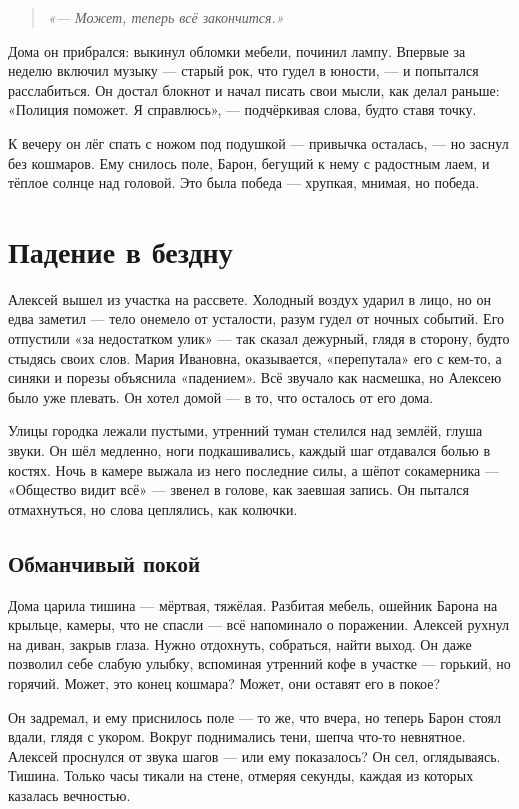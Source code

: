 \documentclass[12pt,a4paper]{book}
\newenvironment{innerthought}{\begin{quote}\small\itshape}{\end{quote}}
\begin{document}
\begin{innerthought}
«— Может, теперь всё закончится.»
\end{innerthought}

Дома он прибрался: выкинул обломки мебели, починил лампу. Впервые за неделю включил музыку — старый рок, что гудел в юности, — и попытался расслабиться. Он достал блокнот и начал писать свои мысли, как делал раньше: «Полиция поможет. Я справлюсь», — подчёркивая слова, будто ставя точку.

К вечеру он лёг спать с ножом под подушкой — привычка осталась, — но заснул без кошмаров. Ему снилось поле, Барон, бегущий к нему с радостным лаем, и тёплое солнце над головой. Это была победа — хрупкая, мнимая, но победа.

\chapter{Падение в бездну}

Алексей вышел из участка на рассвете. Холодный воздух ударил в лицо, но он едва заметил — тело онемело от усталости, разум гудел от ночных событий. Его отпустили «за недостатком улик» — так сказал дежурный, глядя в сторону, будто стыдясь своих слов. Мария Ивановна, оказывается, «перепутала» его с кем-то, а синяки и порезы объяснила «падением». Всё звучало как насмешка, но Алексею было уже плевать. Он хотел домой — в то, что осталось от его дома.

Улицы городка лежали пустыми, утренний туман стелился над землёй, глуша звуки. Он шёл медленно, ноги подкашивались, каждый шаг отдавался болью в костях. Ночь в камере выжала из него последние силы, а шёпот сокамерника — «Общество видит всё» — звенел в голове, как заевшая запись. Он пытался отмахнуться, но слова цеплялись, как колючки.

\section{Обманчивый покой}

Дома царила тишина — мёртвая, тяжёлая. Разбитая мебель, ошейник Барона на крыльце, камеры, что не спасли — всё напоминало о поражении. Алексей рухнул на диван, закрыв глаза. Нужно отдохнуть, собраться, найти выход. Он даже позволил себе слабую улыбку, вспоминая утренний кофе в участке — горький, но горячий. Может, это конец кошмара? Может, они оставят его в покое?

Он задремал, и ему приснилось поле — то же, что вчера, но теперь Барон стоял вдали, глядя с укором. Вокруг поднимались тени, шепча что-то невнятное. Алексей проснулся от звука шагов — или ему показалось? Он сел, оглядываясь. Тишина. Только часы тикали на стене, отмеряя секунды, каждая из которых казалась вечностью.
\end{document}
